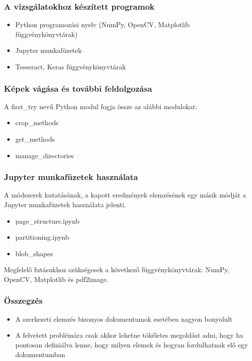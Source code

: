 \documentclass{beamer}
\begin{document}
\begin{frame}[fragile]
\frametitle{A vizsgálatokhoz készített programok}

\begin{itemize}
    \item Python programozási nyelv (NumPy, OpenCV, Matplotlib függvénykönyvtárak)
    \item Jupyter munkafüzetek
    \item Tesseract, Keras függvénykönyvtárak
\end{itemize}

\end{frame}

\begin{frame}[fragile]
\frametitle{Képek vágása és további feldolgozása}

A first\_try nevű Python modul fogja össze az alábbi modulokat:

\bigskip 

\begin{itemize}
    \item crop\_methods
    \item get\_methods
    \item manage\_directories
\end{itemize}

\end{frame}

\begin{frame}[fragile]
\frametitle{Jupyter munkafüzetek használata}

A módszerek kutatásának, a kapott eredmények elemzésének egy másik módját a Jupyter munkafüzetek használata jelenti.

\bigskip 

\begin{itemize}
    \item page\_structure.ipynb
    \item partitioning.ipynb
    \item blob\_shapes
\end{itemize}

\bigskip

Megfelelő futásukhoz szükségesek a következő függvénykönyvtárak: NumPy, OpenCV, Matplotlib és pdf2image.

\end{frame}

\begin{frame}[fragile]
\frametitle{Összegzés}

\begin{itemize}
    \item A szerkezeti elemzés bizonyos dokumentumok esetében nagyon bonyolult
    \item A felvetett problémára csak akkor lehetne tökéletes megoldást adni, hogy ha pontosan definiálva lenne, hogy milyen elemek és hogyan fordulhatnak elő egy dokumentumban
\end{itemize}

\end{frame}
\end{document}
